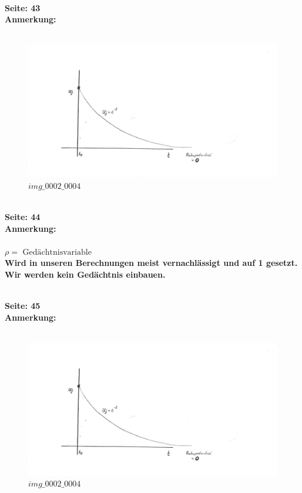 \documentclass[10pt,a4paper]{article}
\newenvironment{merk}[1]{\noindent\makebox[\linewidth]{\rule{\textwidth}{0.2pt}}\\\bf Seite: #1\\ \bf Anmerkung: \\ \\}{}
\begin{document}
\begin{merk}{43}
\begin{figure}[htbp]
    \begin{center}
        \includegraphics[width=.7\textwidth, keepaspectratio, page=1]{img_0002_0004.pdf}
    \caption{$ img\_0002\_0004$}
    \label{img_0002_0004}
    \end{center}
\end{figure}
\end{merk}



\begin{merk}{44}
$\rho = \text{\ Gedächtnisvariable} $\\
Wird in unseren Berechnungen meist vernachlässigt und auf 1 gesetzt.\\
Wir werden kein Gedächtnis einbauen.

\end{merk}
\newpage
\begin{merk}{45}
\begin{figure}[htbp]
    \begin{center}
        \includegraphics[width=.7\textwidth, keepaspectratio, page=2]{img_0002_0004.pdf}
    \caption{$ img\_0002\_0004$}
    \label{img_0002_0004}
    \end{center}
\end{figure}
\end{merk}
\end{document}
